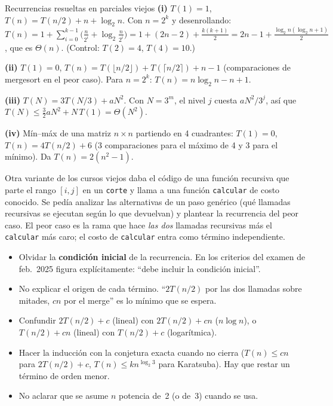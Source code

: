 \begin{problema}{Recurrencias resueltas en parciales viejos}
\textbf{(i)} $T(1)=1$, $T(n)=T(n/2)+n+\log_2 n$. Con $n=2^k$ y desenrollando: $T(n)=1+\sum_{i=0}^{k-1}\bigl(\frac{n}{2^i}+\log_2\frac{n}{2^i}\bigr)=1+(2n-2)+\frac{k(k+1)}2=2n-1+\frac{\log_2 n(\log_2 n+1)}{2}$, que es $\Theta(n)$. (Control: $T(2)=4$, $T(4)=10$.)

\textbf{(ii)} $T(1)=0$, $T(n)=T(\lfloor n/2\rfloor)+T(\lceil n/2\rceil)+n-1$ (comparaciones de mergesort en el peor caso). Para $n=2^k$: $T(n)=n\log_2 n-n+1$.

\textbf{(iii)} $T(N)=3T(N/3)+aN^2$. Con $N=3^m$, el nivel $j$ cuesta $aN^2/3^j$, así que $T(N)\le\frac32 aN^2+N\,T(1)=\Theta(N^2)$.

\textbf{(iv)} Mín--máx de una matriz $n\times n$ partiendo en 4 cuadrantes: $T(1)=0$, $T(n)=4T(n/2)+6$ (3 comparaciones para el máximo de 4 y 3 para el mínimo). Da $T(n)=2(n^2-1)$.
\end{problema}

Otra variante de los cursos viejos daba el código de una función recursiva que parte el rango $[i,j]$ en un \texttt{corte} y llama a una función \texttt{calcular} de costo conocido. Se pedía analizar las alternativas de un paso genérico (qué llamadas recursivas se ejecutan según lo que devuelvan) y plantear la recurrencia del peor caso. El peor caso es la rama que hace \emph{las dos} llamadas recursivas más el \texttt{calcular} más caro; el costo de \texttt{calcular} entra como término independiente.

\begin{trampa}
\begin{itemize}
  \item Olvidar la \textbf{condición inicial} de la recurrencia. En los criterios del examen de feb.~2025 figura explícitamente: ``debe incluir la condición inicial''.
  \item No explicar el origen de cada término. ``$2T(n/2)$ por las dos llamadas sobre mitades, $cn$ por el merge'' es lo mínimo que se espera.
  \item Confundir $2T(n/2)+c$ (lineal) con $2T(n/2)+cn$ ($n\log n$), o $T(n/2)+cn$ (lineal) con $T(n/2)+c$ (logarítmica).
  \item Hacer la inducción con la conjetura exacta cuando no cierra ($T(n)\le cn$ para $2T(n/2)+c$, $T(n)\le kn^{\log_2 3}$ para Karatsuba). Hay que restar un término de orden menor.
  \item No aclarar que se asume $n$ potencia de~2 (o de~3) cuando se usa.
\end{itemize}
\end{trampa}

